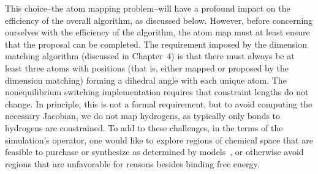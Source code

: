 %
This choice--the atom mapping problem--will have a profound impact on the efficiency of the overall algorithm, as discussed below.
%
However, before concerning ourselves with the efficiency of the algorithm, the atom map must at least ensure that the proposal can be completed.
%
The requirement imposed by the dimension matching algorithm (discussed in Chapter~4) is that there must always be at least three atoms with positions (that is, either mapped or proposed by the dimension matching) forming a dihedral angle with each unique atom.
%
The nonequilibrium switching implementation requires that constraint lengths do not change.
%
In principle, this is not a formal requirement, but to avoid computing the necessary Jacobian, we do not map hydrogens, as typically only bonds to hydrogens are constrained.
%
To add to these challenges, in the terms of the simulation's operator, one would like to explore regions of chemical space that are feasible to purchase or synthesize as determined by models~\cite{Warr2014}, or otherwise avoid regions that are unfavorable for reasons besides binding free energy.
%
